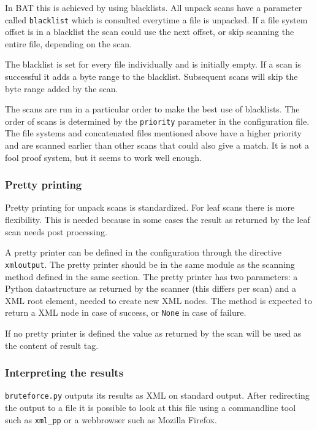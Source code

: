 \documentclass[10pt]{article}
\begin{document}
In BAT this is achieved by using blacklists. All unpack scans have a parameter
called \texttt{blacklist} which is consulted everytime a file is unpacked. If
a file system offset is in a blacklist the scan could use the next offset, or
skip scanning the entire file, depending on the scan.

The blacklist is set for every file individually and is initially empty. If a
scan is successful it adds a byte range to the blacklist. Subsequent scans
will skip the byte range added by the scan.

The scans are run in a particular order to make the best use of blacklists. The
order of scans is determined by the \texttt{priority} parameter in the
configuration file. The file systems and concatenated files mentioned above
have a higher priority and are scanned earlier than other scans that could also
give a match. It is not a fool proof system, but it seems to work well enough.

\subsubsection{Pretty printing}

Pretty printing for unpack scans is standardized. For leaf scans there is more
flexibility. This is needed because in some cases the result as returned by
the leaf scan needs post processing.

A pretty printer can be defined in the configuration through the directive
\texttt{xmloutput}. The pretty printer should be in the same module as the
scanning method defined in the same section. The pretty printer has two
parameters: a Python datastructure as returned by the scanner (this differs
per scan) and a XML root element, needed to create new XML nodes. The method is
expected to return a XML node in case of success, or \texttt{None} in case of
failure.

If no pretty printer is defined the value as returned by the scan will be used
as the content of result tag.

\subsubsection{Interpreting the results}

\texttt{bruteforce.py} outputs its results as XML on standard output. After
redirecting the output to a file it is possible to look at this file using a
commandline tool such as \texttt{xml\_pp} or a webbrowser such as Mozilla
Firefox.
\end{document}
